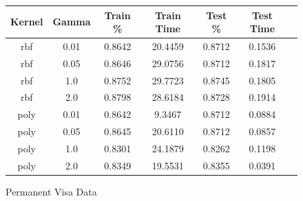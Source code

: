 \documentclass[h]{article}
\begin{document}
\begin{figure}[H]
\begin{tabular}{ | c | c  | c | c | c | c | c |} 
\hline
\textbf{Kernel} & \textbf{Gamma} & \textbf{Train \%} & \textbf{Train Time} & \textbf{Test \%} & \textbf{Test Time}   \\ \hline
rbf & 0.01 & 0.8642 & 20.4459 & 0.8712 & 0.1536 \\ \hline
rbf & 0.05 & 0.8646 & 29.0756 & 0.8712 & 0.1817 \\ \hline
rbf & 1.0 & 0.8752 & 29.7723 & 0.8745 & 0.1805 \\ \hline
rbf & 2.0 & 0.8798 & 28.6184 & 0.8728 & 0.1914 \\ \hline
poly & 0.01 & 0.8642 & 9.3467 & 0.8712 & 0.0884 \\ \hline
poly & 0.05 & 0.8645 & 20.6110 & 0.8712 & 0.0857 \\ \hline
poly & 1.0 & 0.8301 & 24.1879 & 0.8262 & 0.1198 \\ \hline
poly & 2.0 & 0.8349 & 19.5531 & 0.8355 & 0.0391 \\ \hline

\hline
\end{tabular}
\caption*{Permanent Visa Data}
\endminipage\hfill
\end{figure}
\end{document}
